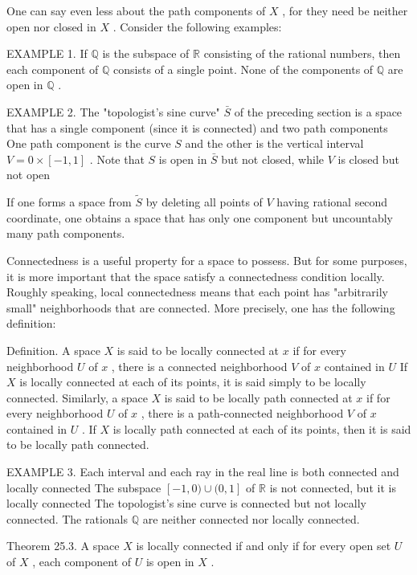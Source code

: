 One can say even less about the path components of \(X\) , for they need be neither open nor closed in \(X\) . Consider the following examples:

EXAMPLE 1. If \(\mathbb{Q}\) is the subspace of \(\mathbb{R}\) consisting of the rational numbers, then each component of \(\mathbb{Q}\) consists of a single point. None of the components of \(\mathbb{Q}\) are open in \(\mathbb{Q}\) .

EXAMPLE 2. The "topologist's sine curve" \(\bar{S}\) of the preceding section is a space that has a single component (since it is connected) and two path components One path component is the curve \(S\) and the other is the vertical interval \(V = 0 \times  \left\lbrack  {-1,1}\right\rbrack\) . Note that \(S\) is open in \(\bar{S}\) but not closed, while \(V\) is closed but not open

If one forms a space from \(\widetilde{S}\) by deleting all points of \(V\) having rational second coordinate, one obtains a space that has only one component but uncountably many path components.

Connectedness is a useful property for a space to possess. But for some purposes, it is more important that the space satisfy a connectedness condition locally. Roughly speaking, local connectedness means that each point has "arbitrarily small" neighborhoods that are connected. More precisely, one has the following definition:

Definition. A space \(X\) is said to be locally connected at \(x\) if for every neighborhood \(U\) of \(x\) , there is a connected neighborhood \(V\) of \(x\) contained in \(U\) If \(X\) is locally connected at each of its points, it is said simply to be locally connected. Similarly, a space \(X\) is said to be locally path connected at \(x\) if for every neighborhood \(U\) of \(x\) , there is a path-connected neighborhood \(V\) of \(x\) contained in \(U\) . If \(X\) is locally path connected at each of its points, then it is said to be locally path connected.

EXAMPLE 3. Each interval and each ray in the real line is both connected and locally connected The subspace \(\left\lbrack  {-1,0)\cup (0,1}\right\rbrack\) of \(\mathbb{R}\) is not connected, but it is locally connected The topologist’s sine curve is connected but not locally connected. The rationals \(\mathbb{Q}\) are neither connected nor locally connected.

Theorem 25.3. A space \(X\) is locally connected if and only if for every open set \(U\) of \(X\) , each component of \(U\) is open in \(X\) .

